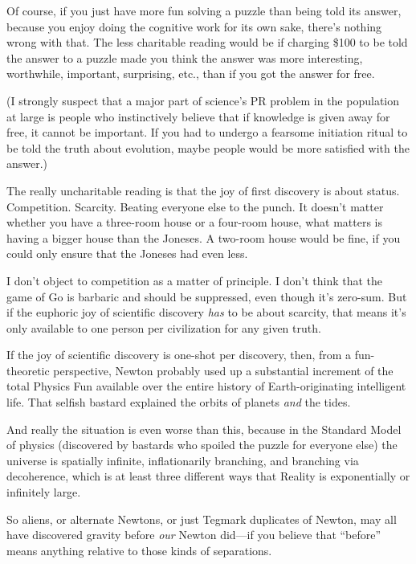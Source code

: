 {
 Of course, if you just have more fun solving a puzzle than being
told its answer, because you enjoy doing the cognitive work for its own
sake, there's nothing wrong with that. The less
charitable reading would be if charging \$100 to be told the answer to
a puzzle made you think the answer was more interesting, worthwhile,
important, surprising, etc., than if you got the answer for free.}

{
 (I strongly suspect that a major part of science's
PR problem in the population at large is people who instinctively
believe that if knowledge is given away for free, it cannot be
important. If you had to undergo a fearsome initiation ritual to be
told the truth about evolution, maybe people would be more satisfied
with the answer.)}

{
 The really uncharitable reading is that the joy of first discovery
is about status. Competition. Scarcity. Beating everyone else to the
punch. It doesn't matter whether you have a three-room
house or a four-room house, what matters is having a bigger house than
the Joneses. A two-room house would be fine, if you could only ensure
that the Joneses had even less.}

{
 I don't object to competition as a matter of
principle. I don't think that the game of Go is
barbaric and should be suppressed, even though it's
zero-sum. But if the euphoric joy of scientific discovery \textit{has}
to be about scarcity, that means it's only available to
one person per civilization for any given truth.}

{
 If the joy of scientific discovery is one-shot per discovery,
then, from a fun-theoretic perspective, Newton probably used up a
substantial increment of the total Physics Fun available over the
entire history of Earth-originating intelligent life. That selfish
bastard explained the orbits of planets \textit{and} the tides.}

{
 And really the situation is even worse than this, because in the
Standard Model of physics (discovered by bastards who spoiled the
puzzle for everyone else) the universe is spatially infinite,
inflationarily branching, and branching via decoherence, which is at
least three different ways that Reality is exponentially or infinitely
large.}

{
 So aliens, or alternate Newtons, or just Tegmark duplicates of
Newton, may all have discovered gravity before \textit{our} Newton
did---if you believe that ``before''
means anything relative to those kinds of separations.}

